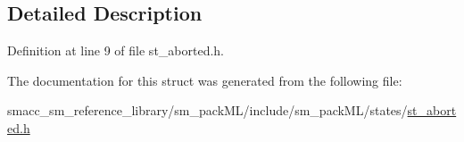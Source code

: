 \subsection{Detailed Description}


Definition at line 9 of file st\+\_\+aborted.\+h.



The documentation for this struct was generated from the following file\+:\begin{DoxyCompactItemize}
\item 
smacc\+\_\+sm\+\_\+reference\+\_\+library/sm\+\_\+pack\+M\+L/include/sm\+\_\+pack\+M\+L/states/\hyperlink{sm__packML_2include_2sm__packML_2states_2st__aborted_8h}{st\+\_\+aborted.\+h}\end{DoxyCompactItemize}
